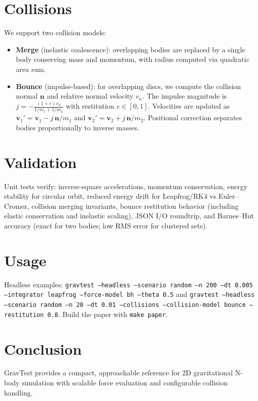 \documentclass[11pt]{article}
\begin{document}
\section{Collisions}
We support two collision models:
\begin{itemize}
  \item \textbf{Merge} (inelastic coalescence): overlapping bodies are replaced by a single body conserving mass and momentum, with radius computed via quadratic area sum.
  \item \textbf{Bounce} (impulse-based): for overlapping discs, we compute the collision normal $\mathbf{n}$ and relative normal velocity $v_n$. The impulse magnitude is $j = -\frac{(1+e) v_n}{1/m_1 + 1/m_2}$ with restitution $e\in[0,1]$. Velocities are updated as $\mathbf{v}_1' = \mathbf{v}_1 - j\,\mathbf{n}/m_1$ and $\mathbf{v}_2' = \mathbf{v}_2 + j\,\mathbf{n}/m_2$. Positional correction separates bodies proportionally to inverse masses.
\end{itemize}

\section{Validation}
Unit tests verify: inverse-square accelerations, momentum conservation, energy stability for circular orbit, reduced energy drift for Leapfrog/RK4 vs Euler--Cromer, collision merging invariants, bounce restitution behavior (including elastic conservation and inelastic scaling), JSON I/O roundtrip, and Barnes--Hut accuracy (exact for two bodies; low RMS error for clustered sets).

\section{Usage}
Headless examples: \texttt{gravtest --headless --scenario random --n 200 --dt 0.005 --integrator leapfrog --force-model bh --theta 0.5} and \texttt{gravtest --headless --scenario random --n 20 --dt 0.01 --collisions --collision-model bounce --restitution 0.8}. Build the paper with \texttt{make paper}.

\section{Conclusion}
GravTest provides a compact, approachable reference for 2D gravitational N-body simulation with scalable force evaluation and configurable collision handling.
\end{document}
